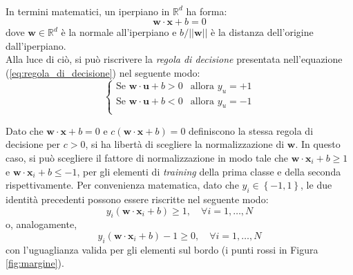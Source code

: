 \\
In termini matematici, un iperpiano in $\mathbb{R}^d$ ha forma:
\begin{equation}
\label{eq:iperpiano}
\mathbf{w}\cdot\mathbf{x}+b=0
\end{equation}
dove $\mathbf{w}\in\mathbb{R}^d$ è la normale all'iperpiano e $b/ \vert\vert\mathbf{w}\vert\vert$ è la distanza dell'origine dall'iperpiano.
\\
Alla luce di ciò, si può riscrivere la \textit{regola di decisione} presentata nell'equazione (\ref{eq:regola_di_decisione}) nel seguente modo:
\begin{equation}
\label{eq:regola_di_decisioneSVM}
\left\{
		\begin{array}{ll}
			\text{Se } \mathbf{w}\cdot\mathbf{u}+b>0 & \mbox{allora } y_u=+1 \\
			\text{Se } \mathbf{w}\cdot\mathbf{u}+b<0 & \mbox{allora } y_u=-1 \\
		\end{array}
	\right.
\end{equation}

Dato che $\mathbf{w}\cdot\mathbf{x}+b=0$ e $c\left (\mathbf{w}\cdot\mathbf{x}+b\right )=0$ definiscono la stessa regola di decisione per $c>0$, si ha libertà di scegliere la normalizzazione di $\mathbf{w}$.
In questo caso, si può scegliere il fattore di normalizzazione in modo tale che $\mathbf{w}\cdot\mathbf{x}_i+b\geq 1$ e $\mathbf{w}\cdot\mathbf{x}_i+b\leq-1$, per gli elementi di \emph{training} della prima classe e della seconda rispettivamente.
Per convenienza matematica, dato che $y_i\in\left\lbrace -1,1\right\rbrace$, le due identità precedenti possono essere riscritte nel seguente modo:
\begin{equation}
\label{eq:disq_elementi1}
y_i\left (\mathbf{w}\cdot\mathbf{x}_i+b\right )\geq1,\quad \forall i=1,\ldots,N
\end{equation}
o, analogamente,
\begin{equation}
\label{eq:disq_elementi2}
y_i\left (\mathbf{w}\cdot\mathbf{x}_i+b\right )-1\geq0,\quad \forall i=1,\ldots,N
\end{equation}
con l'uguaglianza valida per gli elementi sul bordo (i punti rossi in Figura \ref{fig:margine}).
\\

